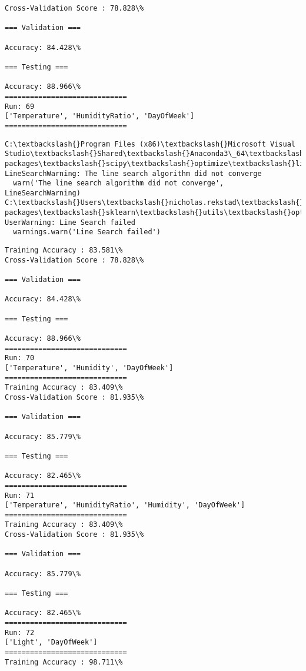 \documentclass[11pt]{article}
\begin{document}
    \begin{Verbatim}[commandchars=\\\{\}]
Cross-Validation Score : 78.828\%

=== Validation ===

Accuracy: 84.428\%

=== Testing ===

Accuracy: 88.966\%
=============================
Run: 69
['Temperature', 'HumidityRatio', 'DayOfWeek']
=============================

    \end{Verbatim}

    \begin{Verbatim}[commandchars=\\\{\}]
C:\textbackslash{}Program Files (x86)\textbackslash{}Microsoft Visual Studio\textbackslash{}Shared\textbackslash{}Anaconda3\_64\textbackslash{}lib\textbackslash{}site-packages\textbackslash{}scipy\textbackslash{}optimize\textbackslash{}linesearch.py:313: LineSearchWarning: The line search algorithm did not converge
  warn('The line search algorithm did not converge', LineSearchWarning)
C:\textbackslash{}Users\textbackslash{}nicholas.rekstad\textbackslash{}AppData\textbackslash{}Roaming\textbackslash{}Python\textbackslash{}Python36\textbackslash{}site-packages\textbackslash{}sklearn\textbackslash{}utils\textbackslash{}optimize.py:195: UserWarning: Line Search failed
  warnings.warn('Line Search failed')

    \end{Verbatim}

    \begin{Verbatim}[commandchars=\\\{\}]
Training Accuracy : 83.581\%
Cross-Validation Score : 78.828\%

=== Validation ===

Accuracy: 84.428\%

=== Testing ===

Accuracy: 88.966\%
=============================
Run: 70
['Temperature', 'Humidity', 'DayOfWeek']
=============================
Training Accuracy : 83.409\%
Cross-Validation Score : 81.935\%

=== Validation ===

Accuracy: 85.779\%

=== Testing ===

Accuracy: 82.465\%
=============================
Run: 71
['Temperature', 'HumidityRatio', 'Humidity', 'DayOfWeek']
=============================
Training Accuracy : 83.409\%
Cross-Validation Score : 81.935\%

=== Validation ===

Accuracy: 85.779\%

=== Testing ===

Accuracy: 82.465\%
=============================
Run: 72
['Light', 'DayOfWeek']
=============================
Training Accuracy : 98.711\%

    \end{Verbatim}
\end{document}
